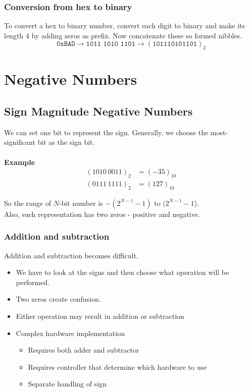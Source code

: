 \documentclass[oneside]{book}
\begin{document}
\subsubsection{Conversion from hex to binary}
To convert a hex to binary number, convert each digit to binary and make its length 4 by adding zeros as prefix. Now concatenate these so formed nibbles.
\[
	\texttt{0xBAD} \longrightarrow \texttt{1011\ 1010\ 1101} \longrightarrow (\texttt{101110101101})_2
\]

\section{Negative Numbers}
\subsection{Sign Magnitude Negative Numbers}
We can set one bit to represent the sign. Generally, we choose the most-significant bit as the sign bit.
\\\\
\textbf{Example}
\begin{align*}
	(1010\ 0011)_2 & = (-35)_{10} \\
	(0111\ 1111)_2 & = (127)_{10}
\end{align*}

\noindent So the range of \(N\)-bit number is \(-(2^{N-1} - 1)\) to \((2^{N-1} - 1\)).
\\
\noindent Also, such representation has two zeros - positive and negative.
\\
\subsubsection{Addition and subtraction}
\noindent Addition and subtraction becomes difficult.
\begin{itemize}
	\item We have to look at the signs and then choose what operation will be performed.
	\item Two zeros create confusion.
	\item Either operation may result in addition or subtraction
	\item Complex hardware implementation
	      \begin{itemize}
		      \item Requires both adder and subtractor
		      \item Requires controller that determine which hardware to use
		      \item Separate handling of sign
	      \end{itemize}
\end{itemize}
\end{document}
